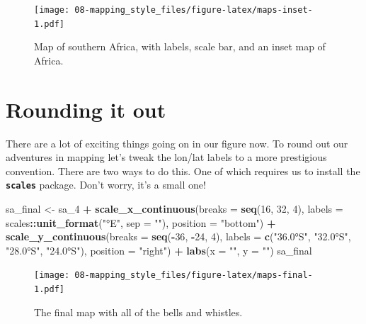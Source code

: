 \documentclass[]{book}
\newenvironment{Shaded}{\begin{snugshade}}{\end{snugshade}}
\newcommand{\KeywordTok}[1]{\textcolor[rgb]{0.13,0.29,0.53}{\textbf{#1}}}
\newcommand{\DataTypeTok}[1]{\textcolor[rgb]{0.13,0.29,0.53}{#1}}
\newcommand{\DecValTok}[1]{\textcolor[rgb]{0.00,0.00,0.81}{#1}}
\newcommand{\StringTok}[1]{\textcolor[rgb]{0.31,0.60,0.02}{#1}}
\newcommand{\OperatorTok}[1]{\textcolor[rgb]{0.81,0.36,0.00}{\textbf{#1}}}
\newcommand{\NormalTok}[1]{#1}
\theoremstyle{definition}
\theoremstyle{definition}
\theoremstyle{definition}
\theoremstyle{remark}
\begin{document}
\begin{figure}
\centering
\texttt{[image: 08-mapping\_style\_files/figure-latex/maps-inset-1.pdf]}
\caption{\label{fig:maps-inset}Map of southern Africa, with labels, scale
bar, and an inset map of Africa.}
\end{figure}

\section{Rounding it out}\label{rounding-it-out}

There are a lot of exciting things going on in our figure now. To round
out our adventures in mapping let's tweak the lon/lat labels to a more
prestigious convention. There are two ways to do this. One of which
requires us to install the \textbf{\texttt{scales}} package. Don't
worry, it's a small one!

\begin{Shaded}
\begin{Highlighting}[]
\NormalTok{sa_final <-}\StringTok{ }\NormalTok{sa_}\DecValTok{4} \OperatorTok{+}
\StringTok{  }\KeywordTok{scale_x_continuous}\NormalTok{(}\DataTypeTok{breaks =} \KeywordTok{seq}\NormalTok{(}\DecValTok{16}\NormalTok{, }\DecValTok{32}\NormalTok{, }\DecValTok{4}\NormalTok{),}
                     \DataTypeTok{labels =}\NormalTok{ scales}\OperatorTok{::}\KeywordTok{unit_format}\NormalTok{(}\StringTok{"°E"}\NormalTok{, }\DataTypeTok{sep =} \StringTok{""}\NormalTok{),}
                     \DataTypeTok{position =} \StringTok{"bottom"}\NormalTok{) }\OperatorTok{+}
\StringTok{  }\KeywordTok{scale_y_continuous}\NormalTok{(}\DataTypeTok{breaks =} \KeywordTok{seq}\NormalTok{(}\OperatorTok{-}\DecValTok{36}\NormalTok{, }\OperatorTok{-}\DecValTok{24}\NormalTok{, }\DecValTok{4}\NormalTok{),}
                     \DataTypeTok{labels =} \KeywordTok{c}\NormalTok{(}\StringTok{"36.0°S"}\NormalTok{, }\StringTok{"32.0°S"}\NormalTok{, }\StringTok{"28.0°S"}\NormalTok{, }\StringTok{"24.0°S"}\NormalTok{),}
                     \DataTypeTok{position =} \StringTok{"right"}\NormalTok{) }\OperatorTok{+}
\StringTok{  }\KeywordTok{labs}\NormalTok{(}\DataTypeTok{x =} \StringTok{""}\NormalTok{, }\DataTypeTok{y =} \StringTok{""}\NormalTok{)}
\NormalTok{sa_final}
\end{Highlighting}
\end{Shaded}

\begin{figure}
\centering
\texttt{[image: 08-mapping\_style\_files/figure-latex/maps-final-1.pdf]}
\caption{\label{fig:maps-final}The final map with all of the bells and
whistles.}
\end{figure}
\end{document}
